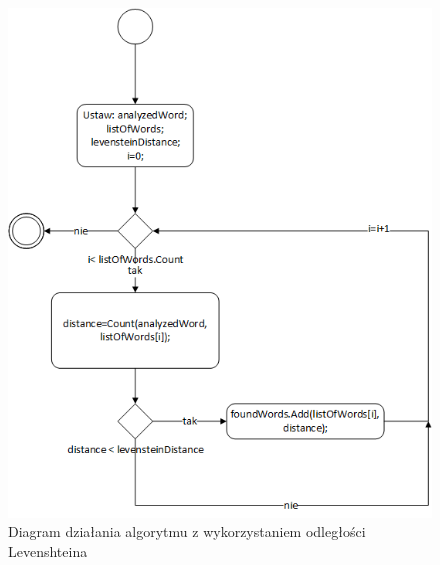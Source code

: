 \begin{figure} [H]
	\centering
	\includegraphics[width=0.8\linewidth]{rozdzial02/Levenstein1.png}
	\caption{Diagram działania algorytmu z wykorzystaniem odległości Levenshteina}
	\label{fig:Lev}
\end{figure}


